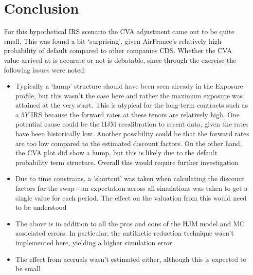 \documentclass[reqno]{article}
\begin{document}
\section{Conclusion}

For this hypothetical IRS scenario the CVA adjustment came out to be quite small. This was found a bit `surprising', given AirFrance's relatively high probability of default compared to other companies CDS. Whether the CVA value arrived at is accurate or not is debatable, since through the exercise the following issues were noted:

\begin{itemize}
\item Typically a `hump' structure should have been seen already in the Exposure profile, but this wasn't the case here and rather the maximum exposure was attained at the very start. This is atypical  for the long-term contracts such as a $5Y$  IRS because the forward rates at these tenors are relatively high.  One potential cause could be the HJM recalibration to recent data, given the rates have been historically low. Another possibility could be that the forward rates are too low compared to the estimated discount factors. On the other hand, the CVA plot did show a hump, but this is likely due to the default probability term structure. Overall this would require further investigation

\item Due to time constrains, a `shortcut' was taken when calculating the discount factors for the swap - an expectation across all simulations was taken to get a single value for each period. The effect on the valuation from this would need to be understood

\item The above is in addition to all the pros and cons of the HJM model and MC associated errors. In particular, the antithetic reduction technique wasn't implemented here, yielding a higher simulation error

\item The effect from accruals wasn't estimated either, although this is expected to be small

\end{itemize}





\end{document}

